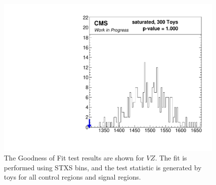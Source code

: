 \begin{figure}
  \centering
  \includegraphics[width=0.65\linewidth]{figures/210308_STXS_VZ_XbbVZ_e4179c95_inclusive_gof/Gof_inclusive_.pdf}
  \caption[Goodness of Fit for $V\!Z$]{
    The Goodness of Fit test results are shown for $V\!Z$.
    The fit is performed using STXS bins,
    and the test statistic is generated by toys for all control regions and signal regions.
  }
  \label{fig:vz-gof}
\end{figure}

